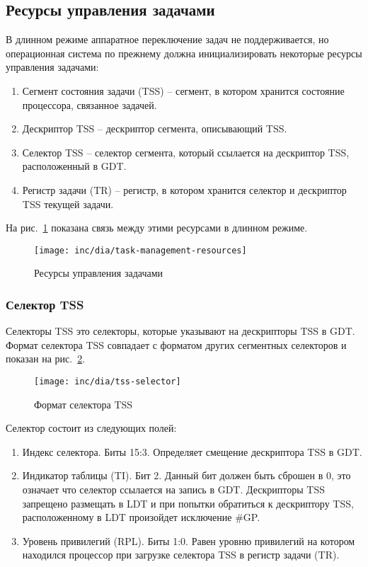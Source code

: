 \subsection{Ресурсы управления задачами}
В длинном режиме аппаратное переключение задач не поддерживается, но
операционная система по прежнему должна инициализировать некоторые ресурсы
управления задачами:
\begin{enumerate}[1.]
\item Сегмент состояния задачи (TSS) -- сегмент, в котором хранится состояние
	процессора, связанное задачей.
\item Дескриптор TSS -- дескриптор сегмента, описывающий TSS.
\item Селектор TSS -- селектор сегмента, который ссылается на дескриптор TSS,
	расположенный в GDT.
\item Регистр задачи (TR) -- регистр, в котором хранится селектор и дескриптор
	TSS текущей задачи.
\end{enumerate}

На рис.~\ref{fig:task_management_resources} показана связь между этими ресурсами в длинном режиме.
\begin{figure}[ht!]
  \centering
  \texttt{[image: inc/dia/task-management-resources]}
  \caption{Ресурсы управления задачами}
  \label{fig:task_management_resources}
\end{figure}

\subsubsection*{Селектор TSS}
Селекторы TSS это селекторы, которые указывают на дескрипторы TSS в GDT.
Формат селектора TSS совпадает с форматом других сегментных селекторов и
показан на рис.~\ref{fig:tss_selector}.

\begin{figure}[ht!]
  \centering
  \texttt{[image: inc/dia/tss-selector]}
  \caption{Формат селектора TSS}
  \label{fig:tss_selector}
\end{figure}

Селектор состоит из следующих полей:
\begin{enumerate}[1.]
\item Индекс селектора. Биты 15:3. Определяет смещение дескриптора TSS в GDT.
\item Индикатор таблицы (TI). Бит 2. Данный бит должен быть сброшен в 0, это
	означает что селектор ссылается на запись в GDT. Дескрипторы TSS
	запрещено размещать в LDT и при попытки обратиться к дескриптору TSS,
	расположенному в LDT произойдет исключение \#GP.
\item Уровень привилегий (RPL). Биты 1:0. Равен уровню привилегий на котором
	находился процессор при загрузке селектора TSS в регистр задачи (TR).
\end{enumerate}

